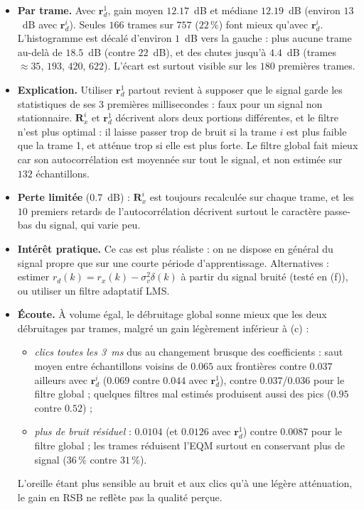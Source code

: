 \begin{interpretation}
\begin{itemize}
  \item \textbf{Par trame.} Avec $\mathbf{r}^1_{d}$, gain moyen $12.17$~dB et médiane $12.19$~dB (environ $13$~dB avec $\mathbf{r}^i_{d}$). Seules $166$ trames sur $757$ ($22\,\%$) font mieux qu'avec $\mathbf{r}^i_{d}$. L'histogramme est décalé d'environ $1$~dB vers la gauche : plus aucune trame au-delà de $18.5$~dB (contre $22$~dB), et des chutes jusqu'à $4.4$~dB (trames $\approx 35$, $193$, $420$, $622$). L'écart est surtout visible sur les $180$ premières trames.
  \item \textbf{Explication.} Utiliser $\mathbf{r}^1_{d}$ partout revient à supposer que le signal garde les statistiques de ses $3$ premières millisecondes : faux pour un signal non stationnaire. $\mathbf{R}^i_x$ et $\mathbf{r}^1_{d}$ décrivent alors deux portions différentes, et le filtre n'est plus optimal : il laisse passer trop de bruit si la trame $i$ est plus faible que la trame 1, et atténue trop si elle est plus forte. Le filtre global fait mieux car son autocorrélation est moyennée sur tout le signal, et non estimée sur $132$ échantillons.
  \item \textbf{Perte limitée} ($0.7$~dB) : $\mathbf{R}^i_x$ est toujours recalculée sur chaque trame, et les $10$ premiers retards de l'autocorrélation décrivent surtout le caractère passe-bas du signal, qui varie peu.
  \item \textbf{Intérêt pratique.} Ce cas est plus réaliste : on ne dispose en général du signal propre que sur une courte période d'apprentissage. Alternatives : estimer $r_d(k)=r_x(k)-\sigma_v^2\delta(k)$ à partir du signal bruité (testé en (f)), ou utiliser un filtre adaptatif LMS.
  \item \textbf{Écoute.} À volume égal, le débruitage global sonne mieux que les deux débruitages par trames, malgré un gain légèrement inférieur à (c) :
  \begin{itemize}
    \item \emph{clics toutes les 3~ms} dus au changement brusque des coefficients : saut moyen entre échantillons voisins de $0.065$ aux frontières contre $0.037$ ailleurs avec $\mathbf{r}^i_{d}$ ($0.069$ contre $0.044$ avec $\mathbf{r}^1_{d}$), contre $0.037$/$0.036$ pour le filtre global ; quelques filtres mal estimés produisent aussi des pics ($0.95$ contre $0.52$) ;
    \item \emph{plus de bruit résiduel} : $0.0104$ (et $0.0126$ avec $\mathbf{r}^1_{d}$) contre $0.0087$ pour le filtre global ; les trames réduisent l'EQM surtout en conservant plus de signal ($36\,\%$ contre $31\,\%$).
  \end{itemize}
  L'oreille étant plus sensible au bruit et aux clics qu'à une légère atténuation, le gain en RSB ne reflète pas la qualité perçue.
\end{itemize}
\end{interpretation}

